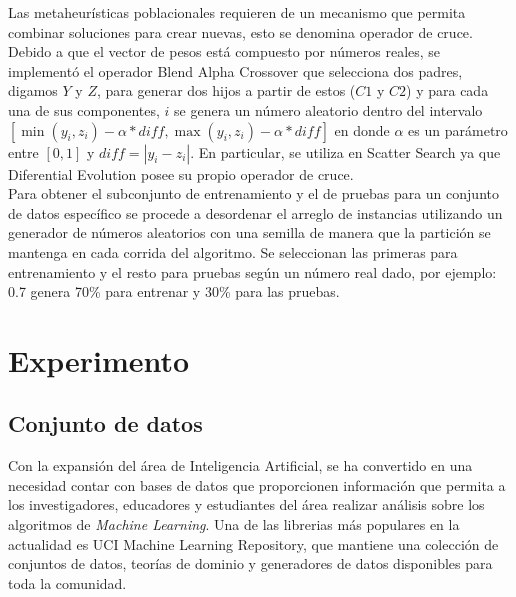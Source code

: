 \documentclass{ci5652}
\begin{document}
Las metaheurísticas poblacionales requieren de un mecanismo que permita combinar soluciones para crear nuevas, esto se denomina operador de cruce. Debido a que el vector de pesos está compuesto por números reales, se implementó el operador Blend Alpha Crossover que selecciona dos padres, digamos $Y$ y $Z$, para generar dos hijos a partir de estos ($C1$ y $C2$) y para cada una de sus componentes, $i$ se genera un número aleatorio dentro del intervalo $[\min(y_i, z_i) - \alpha*diff,\max(y_i, z_i) - \alpha*diff]$ en donde $\alpha$ es un parámetro entre $[0,1]$ y $diff = |y_i - z_i|$. En particular, se utiliza en Scatter Search ya que Diferential Evolution posee su propio operador de cruce.\\

Para obtener el subconjunto de entrenamiento y el de pruebas para un conjunto de datos específico se procede a desordenar el arreglo de instancias utilizando un generador de números aleatorios con una semilla de manera que la partición se mantenga en cada corrida del algoritmo. Se seleccionan las primeras para entrenamiento y el resto para pruebas según un número real dado, por ejemplo: 0.7 genera 70\% para entrenar y 30\% para las pruebas.\\



\section{Experimento}


\subsection{Conjunto de datos}

Con la expansión del área de Inteligencia Artificial, se ha convertido en una
necesidad contar con bases de datos que proporcionen información que permita a
los investigadores, educadores y estudiantes del área realizar análisis sobre 
los algoritmos de \textit{Machine Learning}. Una de las librerias más populares
en la actualidad es UCI Machine Learning Repository, que mantiene una colección
de conjuntos de datos, teorías de dominio y generadores de datos disponibles 
para toda la comunidad.\\
\end{document}
